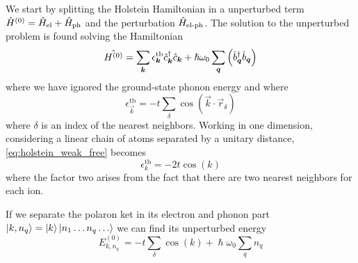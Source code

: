 We start by splitting the Holstein Hamiltonian in a unperturbed term $\hat{H}^{(0)} = \hat{H}_\text{el} + \hat{H}_\text{ph}$ and the perturbation $\hat{H}_\text{el-ph}$.
The solution to the unperturbed problem is found solving the Hamiltonian
\begin{equation}
    \hat{H^{(0)}} = \sum_{\mathbf{\boldsymbol{k}}} \epsilon_{\mathbf{\boldsymbol{k}}}^\text{tb} \hat{c}^\dagger_{\mathbf{\boldsymbol{k}}}\hat{c}_{\mathbf{\boldsymbol{k}}} + \hslash \omega_0\sum_{\mathbf{\boldsymbol{q}}}  \left( \hat{b}^\dagger_{\mathbf{\boldsymbol{q}}} \hat{b}_{\mathbf{\boldsymbol{q}}} \right)
\end{equation}
where we have ignored the ground-state phonon energy and where
\begin{equation} \label{eq:holstein_weak_free}
    \epsilon_\vec{k}^\text{tb} = -t \sum_{    \delta} \cos(\vec{k}\cdot\vec{r}_\delta)
\end{equation}
where $\delta$ is an index of the nearest neighbors. Working in one dimension, considering a linear chain of atoms separated by a unitary distance, \cref{eq:holstein_weak_free} becomes
\begin{equation} \label{eq:holstein_ground}
    \epsilon_k^\text{tb} = -2t \cos(k)
\end{equation}
where the factor two arises from the fact that there are two nearest neighbors for each ion.

If we separate the polaron ket in its electron and phonon part
$    \ket{k, n_q} = \ket{k}\ket{n_1\dots n_q \dots}$ we can find its unperturbed energy
\begin{equation}
    E_{k, n_q}^{(0)} = -t \sum_{    \delta} \cos(k) + \hslash\omega_0 \sum_q n_q
\end{equation}

